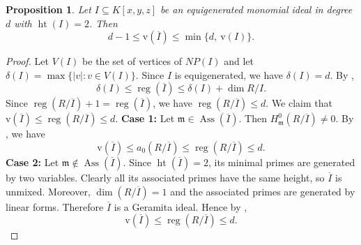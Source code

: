 \documentclass[11pt,reqno,a4paper]{amsart}
\newtheorem{proposition}[theorem]{Proposition}
\theoremstyle{definition}
\begin{document}
\begin{proposition}
\label{equigeneratedht(2)}
Let \(I \subseteq K[x,y,z]\) be an equigenerated monomial ideal in degree \(d\) with \(\operatorname{ht}(I) = 2\). Then
\[
d - 1 \le \mathrm{v}(\overline{I}) \le \min\{d,\ \mathrm{v}(I)\}.
\]
\end{proposition}

\begin{proof}
Let \(V(I)\) be the set of vertices of \(NP(I)\) and let \(\delta(I) = \max\{|v| : v \in V(I)\}\). Since \(I\) is equigenerated, we have \(\delta(I) = d\). By  \cite[Theorem 2.7]{Hoa22},
\[
\delta(I) \le \operatorname{reg}(\overline{I}) \le \delta(I) + \dim R/I.
\]
Since \(\operatorname{reg}(R/\overline{I}) + 1 = \operatorname{reg}(\overline{I})\), we have
\(
\operatorname{reg}(R/\overline{I}) \le d.
\) We claim that \(\mathrm{v}(\overline{I}) \le \operatorname{reg}(R/\overline{I}) \le d\).
\textbf{Case 1:} Let \(\mathfrak{m} \in \operatorname{Ass}(\overline{I})\). Then \(H^0_{\mathfrak{m}}(R/\overline{I}) \neq 0\). By  \cite[Proposition 2.2]{FiorindoGhosh25}, we have
\[
\mathrm{v}(\overline{I}) \le a_0(R/\overline{I}) \le \operatorname{reg}(R/\overline{I}) \le d.
\]
\textbf{Case 2:} Let \(\mathfrak{m} \notin \operatorname{Ass}(\overline{I})\). Since \(\operatorname{ht}(\overline{I}) = 2\), its minimal primes are generated by two variables. Clearly all its associated primes have the same height, so \(\overline{I}\) is unmixed. Moreover, \(\dim(R/\overline{I}) = 1\) and the associated primes are generated by linear forms. Therefore \(\overline{I}\) is a Geramita ideal. Hence by  \cite[Theorem 4.10]{Cooper20},
\[
\mathrm{v}(\overline{I}) \le \operatorname{reg}(R/\overline{I}) \le d.
\]


\end{proof}
\end{document}
